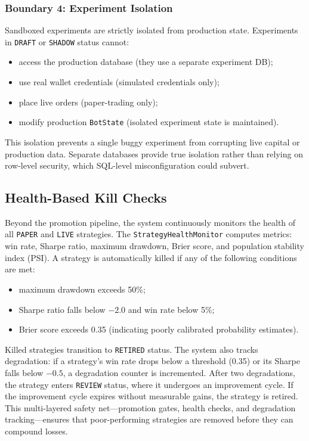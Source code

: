 \subsubsection{Boundary 4: Experiment Isolation}

Sandboxed experiments are strictly isolated from production state. Experiments in \texttt{DRAFT} or \texttt{SHADOW} status cannot:
\begin{itemize}
    \item access the production database (they use a separate experiment DB);
    \item use real wallet credentials (simulated credentials only);
    \item place live orders (paper-trading only);
    \item modify production \texttt{BotState} (isolated experiment state is maintained).
\end{itemize}
This isolation prevents a single buggy experiment from corrupting live capital or production data. Separate databases provide true isolation rather than relying on row-level security, which SQL-level misconfiguration could subvert.

\subsection{Health-Based Kill Checks}

Beyond the promotion pipeline, the system continuously monitors the health of all \texttt{PAPER} and \texttt{LIVE} strategies. The \texttt{StrategyHealthMonitor} computes metrics: win rate, Sharpe ratio, maximum drawdown, Brier score, and population stability index (PSI). A strategy is automatically killed if any of the following conditions are met:
\begin{itemize}
    \item maximum drawdown exceeds 50\%;
    \item Sharpe ratio falls below $-2.0$ and win rate below 5\%;
    \item Brier score exceeds 0.35 (indicating poorly calibrated probability estimates).
\end{itemize}

Killed strategies transition to \texttt{RETIRED} status. The system also tracks degradation: if a strategy's win rate drops below a threshold (0.35) or its Sharpe falls below $-0.5$, a degradation counter is incremented. After two degradations, the strategy enters \texttt{REVIEW} status, where it undergoes an improvement cycle. If the improvement cycle expires without measurable gains, the strategy is retired. This multi-layered safety net---promotion gates, health checks, and degradation tracking---ensures that poor-performing strategies are removed before they can compound losses.

